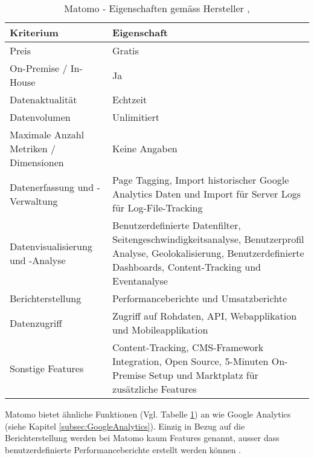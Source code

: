 \begin{table}[h]
	\centering
	\begin{tabular}{ | p{4cm} | p{10cm} |}
		\hline
		\textbf{Kriterium} & \textbf{Eigenschaft}  \\ 
		\hline
    Preis & Gratis \\
    \hline
    On-Premise / In-House & Ja \\
    \hline
    Datenaktualität & Echtzeit \\
    \hline
		Datenvolumen & Unlimitiert \\
    \hline
    Maximale Anzahl Metriken / Dimensionen & Keine Angaben \\
    \hline
		Datenerfassung und -Verwaltung & Page Tagging, Import historischer Google Analytics Daten und Import für Server Logs für Log-File-Tracking \\
    \hline
    Datenvisualisierung und -Analyse & Benutzerdefinierte Datenfilter, Seitengeschwindigkeitsanalyse, Benutzerprofil Analyse,  Geolokalisierung, Benutzerdefinierte Dashboards, Content-Tracking und Eventanalyse \\
    \hline
    Berichterstellung & Performanceberichte und Umsatzberichte \\
    \hline
    Datenzugriff & Zugriff auf Rohdaten, API, Webapplikation und Mobileapplikation \\
    \hline
    Sonstige Features & Content-Tracking, CMS-Framework Integration, Open Source, 5-Minuten On-Premise Setup und Marktplatz für zusätzliche Features \\
		\hline  
	\end{tabular}
	\caption{Matomo - Eigenschaften gemäss Hersteller \parencite{MamotoCloudVsOnPremise}, \parencite{MamotoFeatures}}
	\label{tab: MatomoFeatures}
\end{table}

Matomo bietet ähnliche Funktionen (Vgl. Tabelle \ref{tab: MatomoFeatures}) an wie Google Analytics (siehe Kapitel \ref{subsec:GoogleAnalytics}). Einzig in Bezug auf die Berichterstellung werden bei Matomo kaum Features genannt, ausser dass benutzerdefinierte Performanceberichte erstellt werden können \parencite{MamotoFeatures}. 

